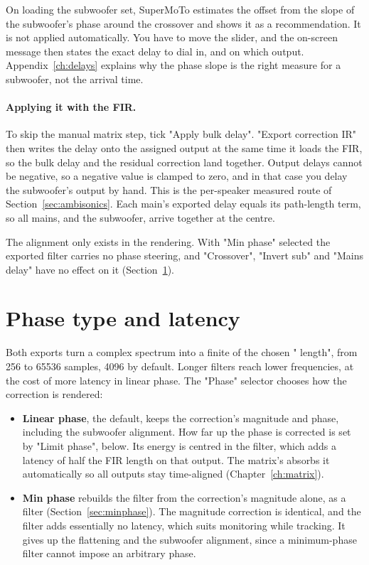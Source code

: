 On loading the subwoofer set, SuperMoTo estimates the offset from the slope of the subwoofer's phase around the crossover and shows it as a recommendation. It is not applied automatically. You have to move the slider, and the on-screen message then states the exact delay to dial in, and on which output. Appendix~\ref{ch:delays} explains why the phase slope is the right measure for a subwoofer,  not the arrival time.

\paragraph{Applying it with the FIR.} To skip the manual matrix step, tick "Apply bulk delay". "Export correction IR" then writes the delay onto the assigned output at the same time it loads the FIR, so the bulk delay and the residual correction land together. Output delays cannot be negative, so a negative value is clamped to zero, and in that case you delay the subwoofer's output by hand. This is the per-speaker measured route of Section~\ref{sec:ambisonics}. Each main's exported delay equals its path-length term, so all mains, and the subwoofer, arrive together at the centre.

The alignment only exists in the  rendering. With "Min phase" selected the exported filter carries no phase steering, and "Crossover", "Invert sub" and "Mains delay" have no effect on it (Section~\ref{sec:render}).

\section{Phase type and latency}\label{sec:render}
Both exports turn a complex spectrum into a finite  of the chosen " length", from 256 to 65536 samples, 4096 by default. Longer filters reach lower frequencies, at the cost of more latency in linear phase. The "Phase" selector chooses how the correction is rendered:

\begin{itemize}[nosep]
  \item \textbf{Linear phase}, the default, keeps the correction's magnitude and phase, including the subwoofer alignment. How far up the phase is corrected is set by "Limit phase", below. Its energy is centred in the filter, which adds a latency of half the FIR length on that output. The matrix's  absorbs it automatically so all outputs stay time-aligned (Chapter~\ref{ch:matrix}).
  \item \textbf{Min phase} rebuilds the filter from the correction's magnitude alone, as a  filter (Section~\ref{sec:minphase}). The magnitude correction is identical, and the filter adds essentially no latency, which suits monitoring while tracking. It gives up the  flattening and the subwoofer alignment, since a minimum-phase filter cannot impose an arbitrary phase.
\end{itemize}

